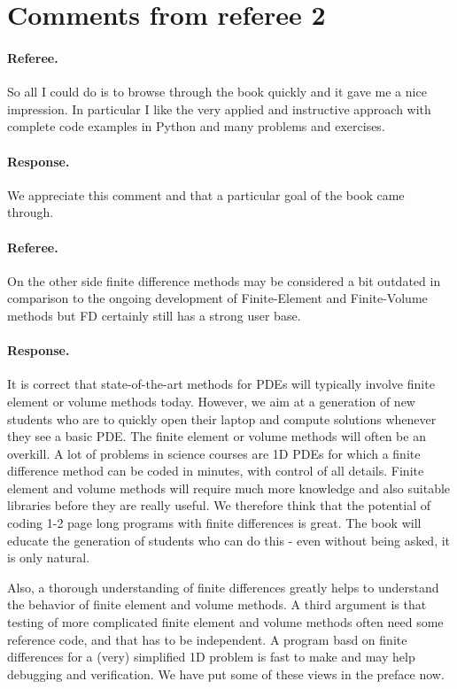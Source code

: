 \documentclass[%
oneside,                 %
final,                   %
10pt]{article}
\begin{document}
\section{Comments from referee 2}

\paragraph{Referee.}
So all I could do is to browse through the book quickly and it gave me a nice impression. In particular I like the very applied and instructive approach with complete code examples in Python and many problems and exercises.

\paragraph{Response.}
We appreciate this comment and that a particular goal of the book came through.

\paragraph{Referee.}
On the other side finite difference methods may be considered a bit outdated in comparison to the ongoing development of Finite-Element and Finite-Volume methods but FD certainly still has a strong user base.

\paragraph{Response.}
It is correct that state-of-the-art methods for PDEs will typically involve finite element or volume methods today. However, we aim at a generation of new students who are to quickly open their laptop and compute solutions whenever they see a basic PDE. The finite element or volume methods will often be an overkill. A lot of problems in science courses are 1D PDEs for which a finite difference method can be coded in minutes, with control of all details. Finite element and volume methods will require much more knowledge and also suitable libraries before they are really useful. We therefore think that the potential of coding 1-2 page long programs with finite differences is great. The book will educate the generation of students who can do this - even without being asked, it is only natural.

Also, a thorough understanding of finite differences greatly helps to understand the behavior of finite element and volume methods. A third argument is that testing of more complicated finite element and volume methods often need some reference code, and that has to be independent. A program basd on finite differences for a (very) simplified 1D problem is fast to make and may help debugging and verification. We have put some of these views in the preface now.
\end{document}
